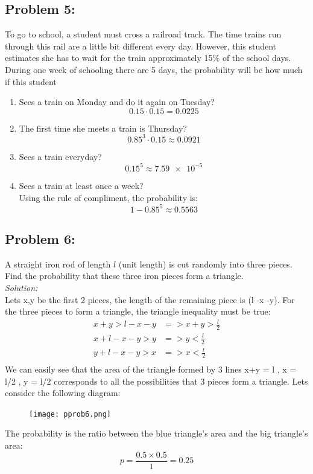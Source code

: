 \documentclass[a4paper]{article}
\begin{document}
	\subsection*{Problem 5:}
	To go to school, a student must cross a railroad track. The time trains run through this rail are a little bit different every day. However, this student estimates she has to wait for the train approximately 15\% of the school days. During one week of schooling there are 5 days, the probability will be how much if this student
	\begin{enumerate}
		\item Sees a train on Monday and do it again on Tuesday?
		\begin{equation*}
		0.15 \cdot 0.15 = 0.0225
		\end{equation*}
		\item The first time she meets a train is Thursday?
		\begin{equation*}
		0.85^3 \cdot 0.15 \approx 0.0921
		\end{equation*}
		\item Sees a train everyday?
		\begin{equation*}
		0.15^5 \approx \num{7.59e-5}
		\end{equation*}
		\item Sees a train at least once a week? \\
		Using the rule of compliment, the probability is: 
		\begin{equation*}
		1 - 0.85^5 \approx 0.5563
		\end{equation*}
	\end{enumerate}
	
	\subsection*{Problem 6:}
	A straight iron rod of length $l$ (unit length) is cut randomly into three pieces. Find the probability that these three iron pieces form a triangle. \\
	\textit{Solution: } \\
	Lets x,y be the first 2 pieces, the length of the remaining piece is (l -x -y).
	For the three pieces to form a triangle, the triangle inequality must be true:
	\begin{align*}
	    x + y > l- x -y  &=> x+y > \frac{l}{2} \\
	    x + l -x -y > y &=> y < \frac{l}{2} \\
	    y + l - x - y > x &=> x < \frac{l}{2} \\
	\end{align*}
	We can easily see that the area of the triangle formed by 3 lines x+y = l , x = l/2 , y = l/2 corresponds to all the possibilities that 3 pieces form a triangle. Lets consider the following diagram:
	\begin{figure}[H]
	    \centering
	    \texttt{[image: pprob6.png]}
	\end{figure}
	The probability is the ratio between the blue triangle's area and the big triangle's area:
	\begin{equation*}
	    p = \frac{0.5 \times 0.5}{1} = 0.25 
	\end{equation*}
\end{document}
